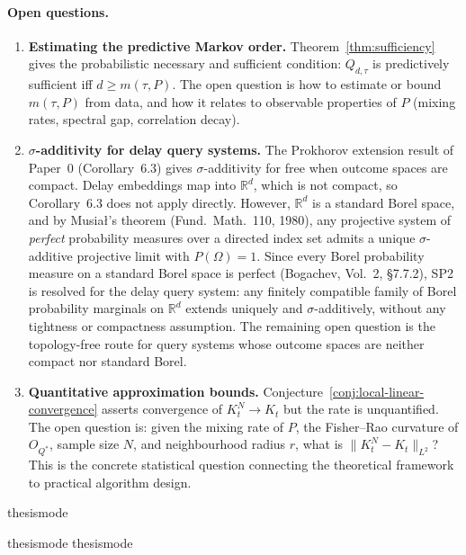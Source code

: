 \paragraph{Open questions.}

\begin{enumerate}
  \item \textbf{Estimating the predictive Markov order.}
    Theorem~\ref{thm:sufficiency} gives the probabilistic necessary and
    sufficient condition: $Q_{d,\tau}$ is predictively sufficient iff
    $d \geq m(\tau, P)$.  The open question is how to estimate or bound
    $m(\tau, P)$ from data, and how it relates to observable properties
    of $P$ (mixing rates, spectral gap, correlation decay).

  \item \textbf{$\sigma$-additivity for delay query systems.}
    The Prokhorov extension result of Paper~0 (Corollary~6.3) gives
    $\sigma$-additivity for free when outcome spaces are compact.  Delay
    embeddings map into $\mathbb{R}^d$, which is not compact, so
    Corollary~6.3 does not apply directly.  However, $\mathbb{R}^d$ is a
    standard Borel space, and by Musia\l's theorem (Fund.\ Math.\ 110,
    1980), any projective system of \emph{perfect} probability measures
    over a directed index set admits a unique $\sigma$-additive projective
    limit with $P(\Omega)=1$.  Since every Borel probability measure on a
    standard Borel space is perfect (Bogachev, Vol.~2, \S7.7.2), SP2 is
    resolved for the delay query system: any finitely compatible family of
    Borel probability marginals on $\mathbb{R}^d$ extends uniquely and
    $\sigma$-additively, without any tightness or compactness assumption.
    The remaining open question is the topology-free route for query
    systems whose outcome spaces are neither compact nor standard Borel.

  \item \textbf{Quantitative approximation bounds.}\label{oq:rates}
    Conjecture~\ref{conj:local-linear-convergence} asserts convergence
    of $K_t^N \to K_t$ but the rate is unquantified.  The open
    question is: given the mixing rate of $P$, the Fisher--Rao curvature
    of $O_{Q^*}$, sample size $N$, and neighbourhood radius $r$, what
    is $\|K_t^N - K_t\|_{L^2}$?  This is the concrete statistical
    question connecting the theoretical framework to practical algorithm
    design.
\end{enumerate}

\ifcsname thesismode\endcsname\else


\fi

\ifcsname thesismode\endcsname\else
\ifcsname thesismode\endcsname\else\fi
\fi
